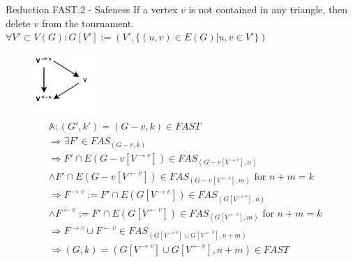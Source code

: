 \documentclass{beamer}
\begin{document}
	\begin{frame}[fragile]{Reduction FAST.2 - Safeness}
		If a vertex \(v\) is not contained in any triangle, then delete \(v\) from the tournament. \\
		\medskip
		\qquad \( \forall V' \subset V(G) : G[ V' ] := (V', \{(u, v) \in E(G) | u, v \in V' \}) \)
		
		\begin{figure}
   			\centering
			\includegraphics[width = 0.2\textwidth]{images/FAST_2/GraphV2.pdf}
		\end{figure}
		
		\begin{align*} %
		& \mathbb{A}: (G',k') = (G-v, k) \in FAST \\
        		& \Rightarrow \exists F' \in FAS_{(G-v, k)} \\
        		& \Rightarrow F' \cap E(G-v[V^{\rightarrow v}]) \in FAS_{(G-v[V^{\rightarrow v}],n)} \\ 
		& \land F' \cap E(G-v[V^{\leftarrow v}]) \in FAS_{(G-v[V^{\leftarrow v}],m)} \text{ for } n + m = k \\
        		& \Rightarrow F^{\rightarrow v} := F' \cap E(G[V^{\rightarrow v}]) \in FAS_{(G[V^{\rightarrow v}],n)} \\ 
		& \land F^{\leftarrow v} := F' \cap E(G[V^{\leftarrow v}]) \in FAS_{(G[V^{\leftarrow v}],m)} \text{ for } n + m = k \\
        		& \Rightarrow F^{\rightarrow v} \cup F^{\leftarrow v} \in FAS_{(G[V^{\rightarrow v}] \cup G[V^{\leftarrow v}], n + m)} \\
        		& \Rightarrow (G,k) = (G[V^{\rightarrow v}] \cup G[V^{\leftarrow v}], n+m) \in FAST
    		\end{align*}
		
	\end{frame}
	
\end{document}
